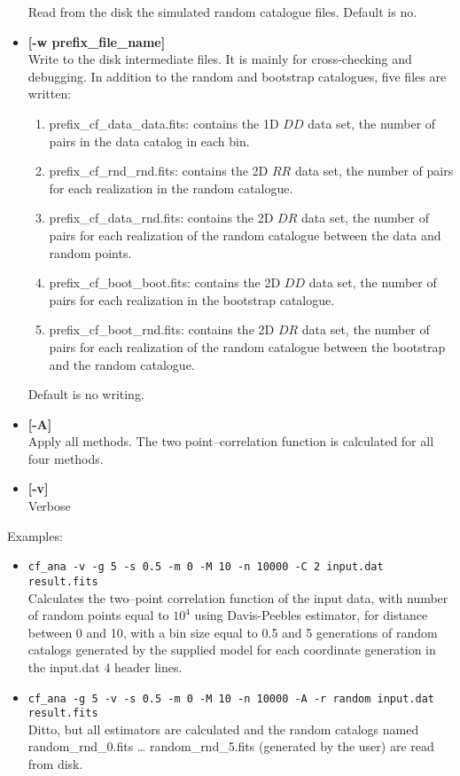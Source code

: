 \begin{itemize}
 Read from the disk the simulated random catalogue files.
 Default is no. 
\item {\bf [-w prefix\_file\_name]} \\
  Write to the disk intermediate files. It is mainly for
  cross-checking and debugging. In addition to the random and
  bootstrap catalogues, five files are written:
\begin{enumerate}
\item prefix\_cf\_data\_data.fits: contains the 1D $DD$ data set, the number
  of pairs in the data catalog in each bin.
\item prefix\_cf\_rnd\_rnd.fits: contains the 2D $RR$ data set, the number of
  pairs for each realization in the random catalogue.
\item prefix\_cf\_data\_rnd.fits: contains the 2D $DR$ data set, the number of
  pairs for each realization of the random catalogue between the data
  and random points.
\item prefix\_cf\_boot\_boot.fits: contains the 2D $DD$ data set, the number
  of pairs for each realization in the bootstrap catalogue.
\item prefix\_cf\_boot\_rnd.fits: contains the 2D $DR$ data set, the number
  of pairs for each realization of the random catalogue between the
  bootstrap and the random catalogue.
\end{enumerate}
Default is no writing. 
\item {\bf [-A]} \\
Apply all methods. The two point--correlation function is calculated
for all four methods.  
 \item {\bf [-v]} \\
Verbose
\end{itemize}
Examples:
\begin{itemize}
\item {\tt cf\_ana -v -g 5 -s 0.5 -m 0 -M 10 -n 10000 -C 2 input.dat
    result.fits}\\ Calculates the two--point correlation function of
  the input data, with number of random points equal to $10^4$ using
  Davis-Peebles estimator, for distance between 0 and 10, with a bin
  size equal to 0.5 and 5 generations of random catalogs generated by
  the supplied model for each coordinate generation in the input.dat 4
  header lines.
\item {\tt cf\_ana -g 5 -v -s 0.5 -m 0 -M 10 -n 10000 -A -r random
    input.dat result.fits}\\ Ditto, but all estimators are calculated
  and the random catalogs named random\_rnd\_0.fits \dots
  random\_rnd\_5.fits (generated by the user) are read from disk.
\end{itemize}

